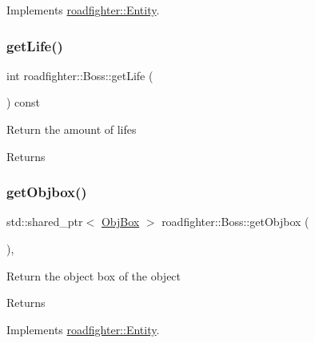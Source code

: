 Implements \hyperlink{classroadfighter_1_1Entity_a08190b0b8e6a3fcdb42273d6096152ac}{roadfighter\+::\+Entity}.

\mbox{\label{classroadfighter_1_1Boss_a06a715dad575e6e51f78be8c8c0836f7}} 
\subsubsection{\texorpdfstring{get\+Life()}{getLife()}}
{\footnotesize\ttfamily int roadfighter\+::\+Boss\+::get\+Life (\begin{DoxyParamCaption}{ }\end{DoxyParamCaption}) const}

Return the amount of lifes \begin{DoxyReturn}{Returns}

\end{DoxyReturn}
\mbox{\label{classroadfighter_1_1Boss_a3cf68c683f4352908eab55fc6ee29e9e}} 
\subsubsection{\texorpdfstring{get\+Objbox()}{getObjbox()}}
{\footnotesize\ttfamily std\+::shared\+\_\+ptr$<$ \hyperlink{structObjBox}{Obj\+Box} $>$ roadfighter\+::\+Boss\+::get\+Objbox (\begin{DoxyParamCaption}{ }\end{DoxyParamCaption})\hspace{0.3cm}{\ttfamily [override]}, {\ttfamily [virtual]}}

Return the object box of the object \begin{DoxyReturn}{Returns}

\end{DoxyReturn}


Implements \hyperlink{classroadfighter_1_1Entity_af14340d04a725175a6d221f23c35fa0c}{roadfighter\+::\+Entity}.

\mbox{\label{classroadfighter_1_1Boss_a9be5ed79ba9419881bb972ea9582b110}} 
